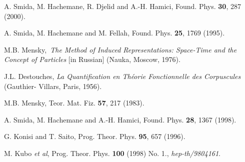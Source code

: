 \documentclass[12pt,a4paper]{article}
\begin{document}
\begin{thebibliography}{99}
A. Smida, M. Hachemane, R. Djelid and A.-H. Hamici, Found.
Phys. \textbf{30}, 287 (2000).

A. Smida, M. Hachemane and M. Fellah, Found. Phys.
\textbf{25}, 1769 (1995).

M.B. Mensky,\textit{\ The Method of Induced
Representations: Space-Time and the Concept of Particles} [in Russian] (Nauka,
Moscow, 1976).

J.L. Destouches, \textit{La Quantification en
Th\'{e}orie Fonctionnelle des Corpuscules} (Gauthier- Villars, Paris, 1956).

M.B. Mensky, Teor. Mat. Fiz. \textbf{57}, 217 (1983).

A. Smida, M. Hachemane and A.-H. Hamici, Found. Phys.
\textbf{28}, 1367 (1998).

G. Konisi and T. Saito, Prog. Theor. Phys. \textbf{95},
657 (1996).

M. Kubo \textit{et al}, Prog. Theor. Phys. \textbf{100}
(1998) No. 1., \textit{hep-th/9804161}.
\end{thebibliography}
\end{document}
